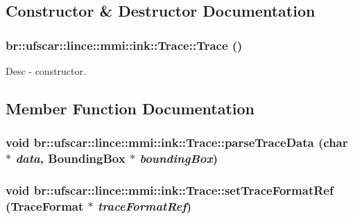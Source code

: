 \subsection{Constructor \& Destructor Documentation}
\hypertarget{classbr_1_1ufscar_1_1lince_1_1mmi_1_1ink_1_1Trace_a87eb33bfb0d672cb8b15e05596c2d185}{
\subsubsection[{Trace}]{\setlength{\rightskip}{0pt plus 5cm}br::ufscar::lince::mmi::ink::Trace::Trace ()}}
\label{classbr_1_1ufscar_1_1lince_1_1mmi_1_1ink_1_1Trace_a87eb33bfb0d672cb8b15e05596c2d185}


Desc -\/ constructor. 



\subsection{Member Function Documentation}
\hypertarget{classbr_1_1ufscar_1_1lince_1_1mmi_1_1ink_1_1Trace_aec507a4fd35f2fd65dedc3a4cd168064}{
\subsubsection[{parseTraceData}]{\setlength{\rightskip}{0pt plus 5cm}void br::ufscar::lince::mmi::ink::Trace::parseTraceData (char $\ast$ {\em data}, \/  {\bf BoundingBox} $\ast$ {\em boundingBox})}}
\label{classbr_1_1ufscar_1_1lince_1_1mmi_1_1ink_1_1Trace_aec507a4fd35f2fd65dedc3a4cd168064}
\hypertarget{classbr_1_1ufscar_1_1lince_1_1mmi_1_1ink_1_1Trace_a2a65005bfc41352c9c9253eef966e8e7}{
\subsubsection[{setTraceFormatRef}]{\setlength{\rightskip}{0pt plus 5cm}void br::ufscar::lince::mmi::ink::Trace::setTraceFormatRef ({\bf TraceFormat} $\ast$ {\em traceFormatRef})}}
\label{classbr_1_1ufscar_1_1lince_1_1mmi_1_1ink_1_1Trace_a2a65005bfc41352c9c9253eef966e8e7}


